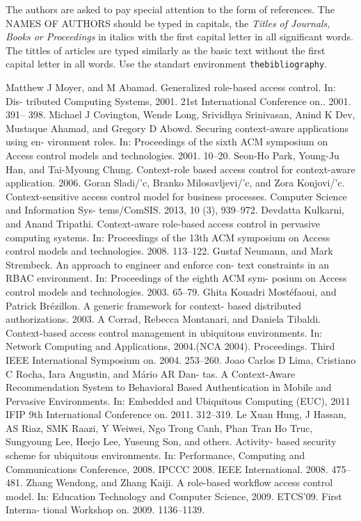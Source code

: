 \documentclass{poster15}
\begin{document}
The authors are asked to pay special attention to the form of references. The NAMES OF AUTHORS should be typed in capitals, the \emph{Titles of Journals, Books or Proceedings} in italics with the first capital letter in all significant words. The tittles of articles are typed similarly as the basic text without the first capital letter in all words. Use the standart environment \verb+thebibliography+.

\begin{thebibliography}{9}
Matthew J Moyer, and M Abamad. Generalized role-based access control. In: Dis-
tributed Computing Systems, 2001. 21st International Conference on.. 2001. 391–
398.
Michael J Covington, Wende Long, Srividhya Srinivasan, Anind K Dev, Mustaque
Ahamad, and Gregory D Abowd. Securing context-aware applications using en-
vironment roles. In: Proceedings of the sixth ACM symposium on Access control
models and technologies. 2001. 10–20.
Seon-Ho Park, Young-Ju Han, and Tai-Myoung Chung. Context-role based access
control for context-aware application. 2006.
Goran Sladi/'c, Branko Milosavljevi/'c, and Zora Konjovi/'c. Context-sensitive access
control model for business processes. Computer Science and Information Sys-
tems/ComSIS. 2013, 10 (3), 939–972.
Devdatta Kulkarni, and Anand Tripathi. Context-aware role-based access control
in pervasive computing systems. In: Proceedings of the 13th ACM symposium on
Access control models and technologies. 2008. 113–122.
Gustaf Neumann, and Mark Strembeck. An approach to engineer and enforce con-
text constraints in an RBAC environment. In: Proceedings of the eighth ACM sym-
posium on Access control models and technologies. 2003. 65–79.
Ghita Kouadri Most\'efaoui, and Patrick Br\'ezillon. A generic framework for context-
based distributed authorizations. 2003.
A Corrad, Rebecca Montanari, and Daniela Tibaldi. Context-based access control
management in ubiquitous environments. In: Network Computing and Applications,
2004.(NCA 2004). Proceedings. Third IEEE International Symposium on. 2004.
253–260.
Joao Carlos D Lima, Cristiano C Rocha, Iara Augustin, and Mário AR Dan-
tas. A Context-Aware Recommendation System to Behavioral Based Authentication
in Mobile and Pervasive Environments. In: Embedded and Ubiquitous Computing
(EUC), 2011 IFIP 9th International Conference on. 2011. 312–319.
Le Xuan Hung, J Hassan, AS Riaz, SMK Raazi, Y Weiwei, Ngo Trong Canh, Phan
Tran Ho Truc, Sungyoung Lee, Heejo Lee, Yuseung Son, and others. Activity-
based security scheme for ubiquitous environments. In: Performance, Computing
and Communications Conference, 2008. IPCCC 2008. IEEE International. 2008.
475–481.
Zhang Wendong, and Zhang Kaiji. A role-based workflow access control model.
In: Education Technology and Computer Science, 2009. ETCS’09. First Interna-
tional Workshop on. 2009. 1136–1139.
\end{thebibliography}
\end{document}
